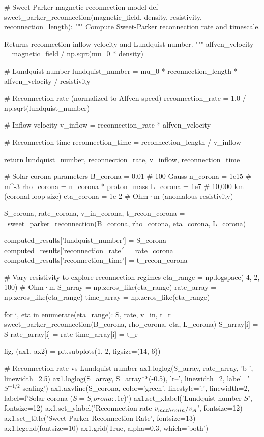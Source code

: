 \documentclass[11pt,a4paper]{article}
\begin{document}
\begin{pycode}
# Sweet-Parker magnetic reconnection model
def sweet_parker_reconnection(magnetic_field, density, resistivity,
                              reconnection_length):
    """
    Compute Sweet-Parker reconnection rate and timescale.

    Returns reconnection inflow velocity and Lundquist number.
    """
    alfven_velocity = magnetic_field / np.sqrt(mu_0 * density)

    # Lundquist number
    lundquist_number = mu_0 * reconnection_length * alfven_velocity / resistivity

    # Reconnection rate (normalized to Alfven speed)
    reconnection_rate = 1.0 / np.sqrt(lundquist_number)

    # Inflow velocity
    v_inflow = reconnection_rate * alfven_velocity

    # Reconnection time
    reconnection_time = reconnection_length / v_inflow

    return lundquist_number, reconnection_rate, v_inflow, reconnection_time

# Solar corona parameters
B_corona = 0.01  # 100 Gauss
n_corona = 1e15  # m^-3
rho_corona = n_corona * proton_mass
L_corona = 1e7  # 10,000 km (coronal loop size)
eta_corona = 1e-2  # Ohm·m (anomalous resistivity)

S_corona, rate_corona, v_in_corona, t_recon_corona = \
    sweet_parker_reconnection(B_corona, rho_corona, eta_corona, L_corona)

computed_results['lundquist_number'] = S_corona
computed_results['reconnection_rate'] = rate_corona
computed_results['reconnection_time'] = t_recon_corona

# Vary resistivity to explore reconnection regimes
eta_range = np.logspace(-4, 2, 100)  # Ohm·m
S_array = np.zeros_like(eta_range)
rate_array = np.zeros_like(eta_range)
time_array = np.zeros_like(eta_range)

for i, eta in enumerate(eta_range):
    S, rate, v_in, t_r = sweet_parker_reconnection(B_corona, rho_corona,
                                                     eta, L_corona)
    S_array[i] = S
    rate_array[i] = rate
    time_array[i] = t_r

fig, (ax1, ax2) = plt.subplots(1, 2, figsize=(14, 6))

# Reconnection rate vs Lundquist number
ax1.loglog(S_array, rate_array, 'b-', linewidth=2.5)
ax1.loglog(S_array, S_array**(-0.5), 'r--', linewidth=2, label='$S^{-1/2}$ scaling')
ax1.axvline(S_corona, color='green', linestyle=':', linewidth=2,
           label=f'Solar corona ($S = {S_corona:.1e}$)')
ax1.set_xlabel('Lundquist number $S$', fontsize=12)
ax1.set_ylabel('Reconnection rate $v_{\\mathrm{in}}/v_A$', fontsize=12)
ax1.set_title('Sweet-Parker Reconnection Rate', fontsize=13)
ax1.legend(fontsize=10)
ax1.grid(True, alpha=0.3, which='both')


\end{pycode}
\end{document}
